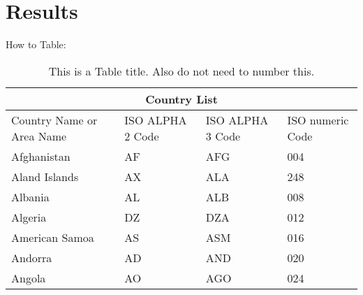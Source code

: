 \noindent \section{Results} \vspace{-9mm} \hrulefill %

\indent \lipsum[1-2] %

How to Table:
\begin{table}[H] %
	\caption{This is a Table title. Also do not need to number this.} %
	\begin{center} %
		\begin{tabular}{ |p{3cm}||p{3cm}|p{3cm}|p{3cm}|  } %
			\hline %
			\multicolumn{4}{|c|}{Country List} \\ %
			\hline %
			Country Name or Area Name & ISO ALPHA 2 Code & ISO ALPHA 3 Code & ISO numeric Code \\
			\hline
			Afghanistan & AF & AFG & 004 \\
			Aland Islands & AX & ALA & 248 \\
			Albania & AL & ALB &  008 \\
			Algeria & DZ & DZA &  012 \\
			American Samoa & AS & ASM & 016 \\
			Andorra & AD & AND & 020 \\
			Angola & AO & AGO & 024 \\
			\hline
		\end{tabular}
	\end{center}
	\vspace{-8.5mm}
\end{table}

